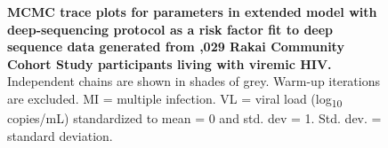 \documentclass[10pt,letterpaper]{article}
\begin{document}
\begin{figure}[!ht]
\caption{{\bf MCMC trace plots for parameters in extended model with deep-sequencing protocol as a risk factor fit to deep sequence data generated from ,029 Rakai Community Cohort Study participants living with viremic HIV.} Independent chains are shown in shades of grey. Warm-up iterations are excluded. MI = multiple infection. VL = viral load (log\textsubscript{10} copies/mL) standardized to mean = 0 and std. dev = 1. Std. dev. = standard deviation. }
\end{figure}
\end{document}

